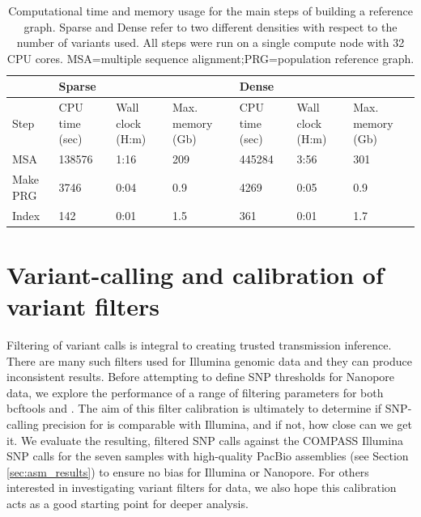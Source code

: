 \begin{table}
\centering
\begin{tabular}{|l|l|l|l|l|l|l|}
\hline
         & \multicolumn{3}{l|}{Sparse}                          & \multicolumn{3}{l|}{Dense}                           \\ \hline
Step     & CPU time (sec) & Wall clock (H:m) & Max. memory (Gb) & CPU time (sec) & Wall clock (H:m) & Max. memory (Gb) \\ \cline{1-2} \cline{4-5} \cline{7-7} 
MSA      & 138576         & 1:16             & 209              & 445284         & 3:56             & 301              \\ \cline{1-2} \cline{4-5} \cline{7-7} 
Make PRG & 3746           & 0:04             & 0.9              & 4269           & 0:05             & 0.9              \\ \cline{1-2} \cline{4-5} \cline{7-7} 
Index    & 142            & 0:01             & 1.5              & 361            & 0:01             & 1.7              \\ \cline{1-2} \cline{4-5} \cline{7-7} 
\end{tabular}
\caption{Computational time and memory usage for the main steps of building a \mtb{} reference graph. Sparse and Dense refer to two different densities with respect to the number of variants used. All steps were run on a single compute node with 32 CPU cores. MSA=multiple sequence alignment;PRG=population reference graph.}
\label{tab:build-prg}
\end{table}


\section{Variant-calling and calibration of \ont{} variant filters}
\label{sec:var-calls}

Filtering of variant calls is integral to creating trusted transmission
inference. There are many such filters used for Illumina genomic data
and they can produce inconsistent results\cite{walter2020}. Before
attempting to define SNP thresholds for Nanopore data, we explore the
performance of a range of filtering parameters for both bcftools and \pandora{}.  
The aim of this filter calibration is ultimately to determine if SNP-calling precision for \ont{} is comparable with Illumina, and if not, how close can we get it.
We evaluate the resulting, filtered SNP calls
against the COMPASS Illumina SNP calls for the seven
samples with high-quality PacBio assemblies (see Section \autoref{sec:asm_results}) to ensure no bias for
Illumina or Nanopore.
For others interested in investigating variant filters for \ont{} data, we also hope this calibration acts as a good starting point for deeper analysis.

